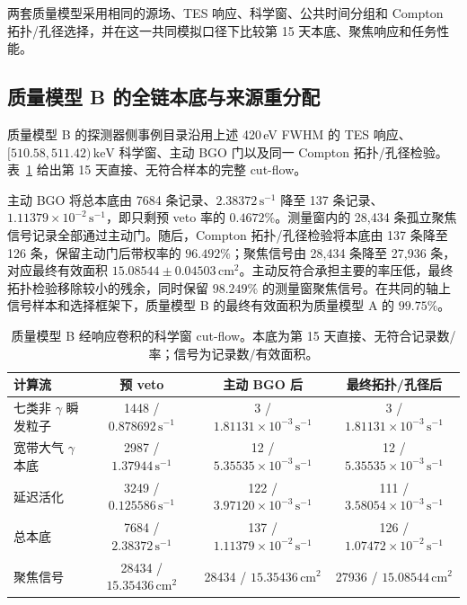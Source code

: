 \documentclass[11pt]{article}
\newcommand{\revblue}[1]{\textcolor{revisionblue}{#1}}
\newcommand{\keV}{\,\mathrm{keV}}
\newcommand{\cps}{\,\mathrm{s^{-1}}}
\begin{document}
\revblue{两套质量模型采用相同的源场、TES 响应、科学窗、公共时间分组和 Compton 拓扑/孔径选择，并在这一共同模拟口径下比较第 15 天本底、聚焦响应和任务性能。}

\FloatBarrier

\subsection{质量模型 B 的全链本底与来源重分配}
\label{subsec:optimized_fullchain_zh}

质量模型 B 的探测器侧事例目录沿用上述 420\,eV FWHM 的 TES 响应、$[510.58,511.42)\keV$ 科学窗、主动 BGO 门以及同一 Compton 拓扑/孔径检验。表~\ref{tab:optimized_cutflow_zh} 给出第 15 天直接、无符合样本的完整 cut-flow。

主动 BGO 将总本底由 7684 条记录、$2.38372\cps$ 降至 137 条记录、$1.11379\times10^{-2}\cps$，即只剩预 veto 率的 $0.4672\%$。测量窗内的 28,434 条孤立聚焦信号记录全部通过主动门。随后，Compton 拓扑/孔径检验将本底由 137 条降至 126 条，保留主动门后带权率的 $96.492\%$；聚焦信号由 28,434 条降至 27,936 条，对应最终有效面积 $15.08544\pm0.04503\,\mathrm{cm^2}$。主动反符合承担主要的率压低，最终拓扑检验移除较小的残余，同时保留 $98.249\%$ 的测量窗聚焦信号。\revblue{在共同的轴上信号样本和选择框架下，质量模型 B 的最终有效面积为质量模型 A 的 $99.75\%$。}

\begin{table}[H]
\centering
\caption{质量模型 B 经响应卷积的科学窗 cut-flow。本底为第 15 天直接、无符合记录数/率；信号为记录数/有效面积。}
\label{tab:optimized_cutflow_zh}
\footnotesize
\begin{tabular}{lccc}
\toprule
计算流 & 预 veto & 主动 BGO 后 & 最终拓扑/孔径后 \\
\midrule
\revblue{七类非 $\gamma$ 瞬发粒子} & 1448 / $0.878692\cps$ & 3 / $1.81131\times10^{-3}\cps$ & 3 / $1.81131\times10^{-3}\cps$ \\
宽带大气 $\gamma$ 本底 & 2987 / $1.37944\cps$ & 12 / $5.35535\times10^{-3}\cps$ & 12 / $5.35535\times10^{-3}\cps$ \\
延迟活化 & 3249 / $0.125586\cps$ & 122 / $3.97120\times10^{-3}\cps$ & 111 / $3.58054\times10^{-3}\cps$ \\
总本底 & 7684 / $2.38372\cps$ & 137 / $1.11379\times10^{-2}\cps$ & 126 / $1.07472\times10^{-2}\cps$ \\
聚焦信号 & 28434 / $15.35436\,\mathrm{cm^2}$ & 28434 / $15.35436\,\mathrm{cm^2}$ & 27936 / $15.08544\,\mathrm{cm^2}$ \\
\bottomrule
\end{tabular}
\end{table}
\end{document}
